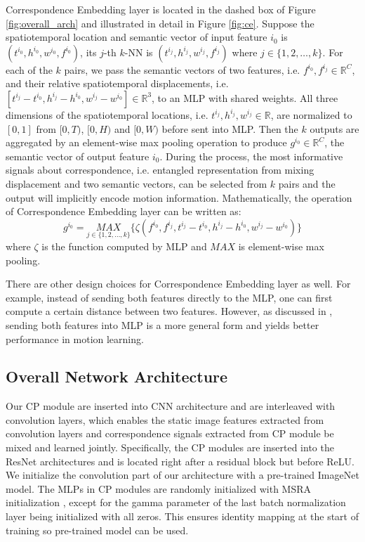 \documentclass[10pt,twocolumn,letterpaper]{article}
\begin{document}
Correspondence Embedding layer is located in the dashed box of Figure \ref{fig:overall_arch} and illustrated in detail in Figure \ref{fig:ce}. Suppose the spatiotemporal location and semantic vector of input feature $i_0$ is $(t^{i_0},h^{i_0},w^{i_0},f^{i_0})$, its $j$-th $k$-NN is $(t^{i_j},h^{i_j},w^{i_j},f^{i_j})$ where $j\in \{1,2,\ldots,k\}$. For each of the $k$ pairs, we pass the semantic vectors of two features, i.e. $f^{i_0}, f^{i_j} \in \mathbb{R}^C$, and their relative spatiotemporal displacements, i.e. $[t^{i_j}-t^{i_0},h^{i_j}-h^{i_0},w^{i_j}-w^{i_0}]\in\mathbb{R}^3$, to an MLP with shared weights. All three dimensions of the spatiotemporal locations, i.e. $t^{i_j}, h^{i_j}, w^{i_j}\in \mathbb{R}$, are normalized to $[0,1]$ from $[0,T)$, $[0,H)$ and $[0,W)$ before sent into MLP.  Then the $k$ outputs are aggregated by an element-wise max pooling operation to produce $g^{i_0} \in \mathbb{R}^C$, the semantic vector of output feature $i_0$. During the process, the most informative signals about correspondence, i.e. entangled representation from mixing displacement and two semantic vectors, can be selected from $k$ pairs and the output will implicitly encode motion information. Mathematically, the operation of Correspondence Embedding layer can be written as:
\begin{equation}\label{eq:ce:layer}
g^{i_0}=\underset{j\in \{1,2,\ldots,k\}}{MAX} \{ \zeta(f^{i_0}, f^{i_j}, t^{i_j}-t^{i_0},h^{i_j}-h^{i_0},w^{i_j}-w^{i_0}) \}
\end{equation}
where $\zeta$ is the function computed by MLP and $MAX$ is element-wise max pooling.

There are other design choices for Correspondence Embedding layer as well. For example, instead of sending both features directly to the MLP, one can first compute a certain distance between two features. 
However, as discussed in \cite{FlowNet3D}, sending both features into MLP is a more general form and yields better performance in motion learning.

\subsection{Overall Network Architecture}

Our CP module are inserted into CNN architecture and are interleaved with convolution layers, which enables the static image features extracted from convolution layers and correspondence signals extracted from CP module be mixed and learned jointly. 
Specifically, the CP modules are inserted into the ResNet \cite{ResNet} architectures and is located right after a residual block but before ReLU. 
We initialize the convolution part of our architecture with a pre-trained ImageNet model. The MLPs in CP modules are randomly initialized with MSRA initialization \cite{MSRA:init}, except for the gamma parameter of the last batch normalization layer \cite{batchnorm} being initialized with all zeros. This ensures identity mapping at the start of training so pre-trained model can be used.
\end{document}
